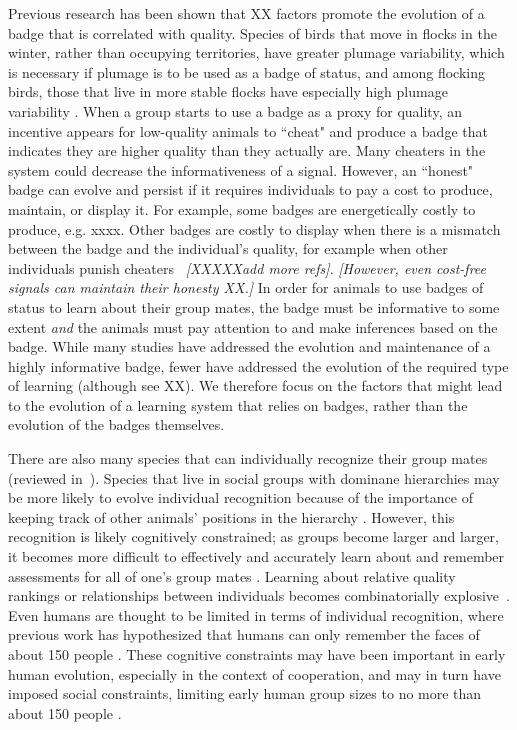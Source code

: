 Previous research has been shown that XX factors promote the evolution of a badge that is correlated with quality. Species of birds that move in flocks in the winter, rather than occupying territories, have greater plumage variability, which is necessary if plumage is to be used as a badge of status, and among flocking birds, those that live in more stable flocks have especially high plumage variability \cite{Rohwer:1975fk}. When a group starts to use a badge as a proxy for quality, an incentive appears for low-quality animals to ``cheat" and produce a badge that indicates they are higher quality than they actually are. Many cheaters in the system could decrease the informativeness of a signal. However, an ``honest" badge can evolve and persist if it requires individuals to pay a cost to produce, maintain, or display it. For example, some badges are energetically costly to produce, e.g. xxxx. Other badges are costly to display when there is a mismatch between the badge and the individual's quality, for example when other individuals punish cheaters ~\cite{Smith2003AnimalSignals,Tibbetts:2004kx}\textit{[XXXXXadd more refs]}.  \textit{[However, even cost-free signals can maintain their honesty \cite{Dawkins:1991ly}XX.]} In order for animals to use badges of status to learn about their group mates, the badge must be informative to some extent \emph{and} the animals must pay attention to and make inferences based on the badge. While many studies have addressed the evolution and maintenance of a highly informative badge, fewer have addressed the evolution of the required type of learning (although see XX).  We therefore focus on the factors that might lead to the evolution of a learning system that relies on badges, rather than the evolution of the badges themselves.


There are also many species that can individually recognize their group mates (reviewed in~\cite{Tibbetts2007IndividualDifferent,Wiley2013SpecificityBehaviour}). Species that live in social groups with dominane hierarchies may be more likely to evolve individual recognition because of the importance of keeping track of other animals' positions in the hierarchy \cite{Barnard:1979fk}. However, this recognition is likely cognitively constrained; as groups become larger and larger, it becomes more difficult to effectively and accurately learn about and remember assessments for all of one's group mates \cite{Rohwer:1982fk}. Learning about relative quality rankings or relationships between individuals becomes combinatorially explosive~\cite{Seyfarth2015SocialCognition}. Even humans are thought to be limited in terms of individual recognition, where previous work has hypothesized that humans can only remember the faces of about 150 people \cite{Dunbar:1993zr,Hill:2003ly}. These cognitive constraints may have been important in early human evolution, especially in the context of cooperation, and may in turn have imposed social constraints, limiting early human group sizes to no more than about 150 people \cite{Dunbar:1993zr,Dunbar:1992ys}.


